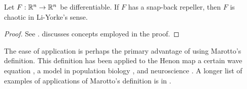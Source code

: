 \documentclass[10pt,draft,twoside]{book}
\begin{document}
\begin{theorem}
  \citep{marotto1,marotto2}
  Let $F: \mathbb{R}^n \to \mathbb{R}^n$ be differentiable.
  If $F$ has a snap-back repeller, then $F$ is chaotic in Li-Yorke's sense.
  \label{thm:sbrepeller}
  \begin{proof}
    See \citet[Theorem 3.1]{marotto1}.
    \citet{martellibook} discusses concepts employed in the proof.
  \end{proof}
\end{theorem}
The ease of application is perhaps the primary advantage of using Marotto's definition.
This definition has been applied to the Henon map \citep{marotto1} a certain wave equation \citep{marottoapp1}, a model in population biology \citep{marottoapp2}, and neuroscience \citep{marottoapp3}.
A longer list of examples of applications of Marotto's definition is in \citet{marotto2}.
\end{document}
